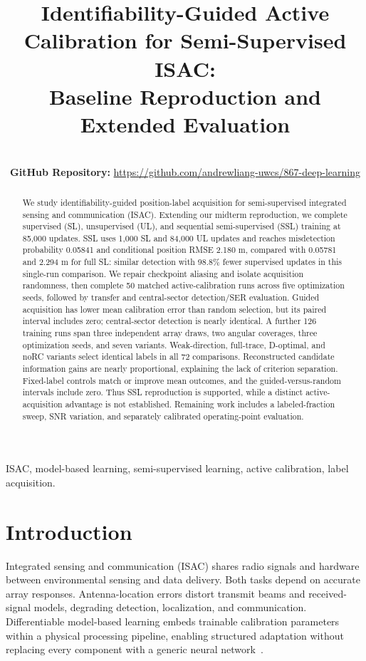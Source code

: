 \documentclass[conference]{IEEEtran}
\title{Identifiability-Guided Active Calibration for Semi-Supervised ISAC:\\Baseline Reproduction and Extended Evaluation}
\author{\IEEEauthorblockN{Muneef Mohammed, Andrew Liang, and Mohammad Al-Shammeri}
\IEEEauthorblockA{CISC 867: Deep Learning, Queen's University\\Updated midterm report: experiments through November 8, 2026}\\
\textbf{GitHub Repository:} \url{https://github.com/andrewliang-uwcs/867-deep-learning}}
\begin{document}
\maketitle
\begin{abstract}
We study identifiability-guided position-label acquisition for semi-supervised integrated sensing and communication (ISAC). Extending our midterm reproduction, we complete supervised (SL), unsupervised (UL), and sequential semi-supervised (SSL) training at 85,000 updates. SSL uses 1,000 SL and 84,000 UL updates and reaches misdetection probability 0.05841 and conditional position RMSE 2.180 m, compared with 0.05781 and 2.294 m for full SL: similar detection with 98.8\% fewer supervised updates in this single-run comparison. We repair checkpoint aliasing and isolate acquisition randomness, then complete 50 matched active-calibration runs across five optimization seeds, followed by transfer and central-sector detection/SER evaluation. Guided acquisition has lower mean calibration error than random selection, but its paired interval includes zero; central-sector detection is nearly identical. A further 126 training runs span three independent array draws, two angular coverages, three optimization seeds, and seven variants. Weak-direction, full-trace, D-optimal, and noRC variants select identical labels in all 72 comparisons. Reconstructed candidate information gains are nearly proportional, explaining the lack of criterion separation. Fixed-label controls match or improve mean outcomes, and the guided-versus-random intervals include zero. Thus SSL reproduction is supported, while a distinct active-acquisition advantage is not established. Remaining work includes a labeled-fraction sweep, SNR variation, and separately calibrated operating-point evaluation.

\end{abstract}
\begin{IEEEkeywords}
ISAC, model-based learning, semi-supervised learning, active calibration, label acquisition.
\end{IEEEkeywords}

\section{Introduction}
Integrated sensing and communication (ISAC) shares radio signals and hardware between environmental sensing and data delivery. Both tasks depend on accurate array responses. Antenna-location errors distort transmit beams and received-signal models, degrading detection, localization, and communication. Differentiable model-based learning embeds trainable calibration parameters within a physical processing pipeline, enabling structured adaptation without replacing every component with a generic neural network~\cite{icc,multi}.
\end{document}
